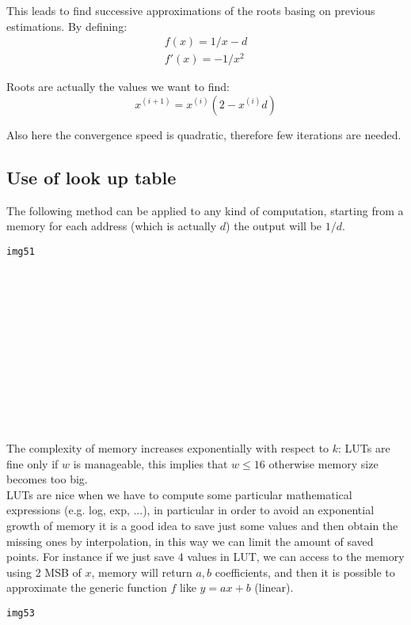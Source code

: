 This leads to find successive approximations of the roots basing on previous estimations. By defining:
\begin{eqnarray}
f(x)=1/x -d \\
f'(x)=-1/x^2
\end{eqnarray}

Roots are actually the values we want to find:
$$x^{(i+1)}=x^{(i)}(2-x^{(i)}d)$$

Also here the convergence speed is quadratic, therefore few iterations are needed.

\subsection{Use of look up table}
The following method can be applied to any kind of computation, starting from a memory for each address (which is actually $d$) the output will be $1/d$.

\begin{verbatim}
img51














\end{verbatim}

The complexity of memory increases exponentially with respect to $k$: LUTs are fine only if $w$ is manageable, this implies that $w \leq 16$ otherwise memory size becomes too big.\\

LUTs are nice when we have to compute some particular mathematical expressions (e.g. log, exp, ...), in particular in order to avoid an exponential growth of memory it is a good idea to save just some values and then obtain the missing ones by interpolation, in this way we can limit the amount of saved points. For instance if we just save 4 values in LUT, we can access to the memory using 2 MSB of $x$, memory will return $a,b$ coefficients, and then it is possible to approximate the generic function $f$ like $y=ax+b$ (linear).

\begin{verbatim}
img53














\end{verbatim}

